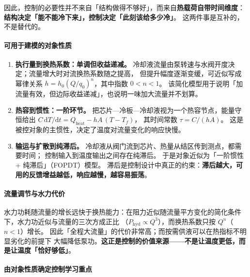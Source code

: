 \documentclass[stage2,fontset=fandol]{ydzjreport}
\begin{document}
	因此，控制的必要性并不来自「结构做得不够好」，而来自\textbf{热载荷自带时间维度}：
	\textbf{结构决定「能不能冷下来」，控制决定「此刻该给多少冷」}。
	这两件事是互补的，不是替代的。

	\paragraph{可用于建模的对象性质}

	\begin{enumerate}
		\item \textbf{执行量到换热系数：单调但收益递减。}
		冷却液流量由泵转速与水阀开度决定；流量增大时对流换热系数随之提高，
		但提升幅度逐渐变缓，可近似写成幂律关系
		$h = h_0 (Q/q_0)^n$，其中指数 $0<n<1$。
		该简化模型用于说明「加流量有效，但边际收益递减」，也说明一味加大流量并不划算。

		\item \textbf{热容到惯性：一阶环节。}
		把芯片—冷板—冷却液视为一个热容节点，能量守恒给出
		$C\,\mathrm{d}T/\mathrm{d}t = Q_{\mathrm{heat}} - hA\,(T - T_f)$，
		其时间常数 $\tau = C/(hA)$。
		这是被控对象的主惯性，决定了温度对流量变化的响应快慢。

		\item \textbf{输运与扩散到纯滞后。}
		冷却液从阀门流到芯片、热量从结区传到测点，都需要时间；
		控制输入到温度输出之间存在纯滞后。
		于是对象近似为「一阶惯性 + 纯滞后」（FOPDT）模型。
		滞后是控制设计中真正的约束：\textbf{滞后越大，可用的反馈增益越低，响应越慢，越容易振荡}。
	\end{enumerate}

	\paragraph{流量调节与水力代价}

	水力功耗随流量的增长远快于换热能力：在阻力近似随流量平方变化的简化条件下，水力功近似与流量的三次方成正比
	（$P_{\mathrm{hyd}} \propto Q^3$），而换热系数只按 $Q^n$（$n<1$）增长。
	因此「全程大流量」的代价非常高；而按需供液可以在热指标不明显劣化的前提下
	大幅降低泵功。\textbf{这正是控制的价值来源——不是让温度更低，而是让温度「恰好够低」}。

	\paragraph{由对象性质确定控制学习重点}
\end{document}
